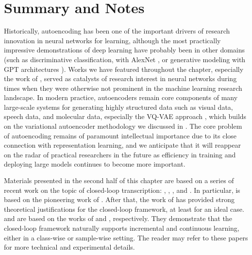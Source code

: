 \documentclass[../../book-main.tex]{subfiles}
\begin{document}
\section{Summary and Notes}
Historically, autoencoding has been one of the important drivers of research
innovation in neural networks for learning, although the most practically
impressive demonstrations of deep learning have probably been in other domains
(such as discriminative classification, with AlexNet
\cite{krizhevsky2012imagenet}, or generative modeling with GPT architectures
\cite{brown2020language}).
Works we have featured throughout the chapter, especially the work of
\cite{Hinton504}, served as catalysts of research interest in neural networks
during times when they were otherwise not prominent in the machine learning
research landscape. 
In modern practice, autoencoders remain core components of many large-scale
systems for generating highly structured data such as visual data, speech data,
and molecular data, especially the VQ-VAE approach
\cite{van-den-Oord2017-jr}, which builds on the variational autoencoder
methodology we discussed in .
The core problem of autoencoding remains of paramount intellectual importance
due to its close connection with representation learning, and we anticipate that
it will reappear on the radar of practical researchers in the future as
efficiency in training and deploying large models continues to become more
important.

Materials presented in the second half of this chapter are based on a series of
recent work on the topic of closed-loop transcription: \cite{Dai-entropy-2022}, 
\cite{pai2022pursuit}, \cite{tong2023incremental}, and \cite{pmlr-v234-tong24a}. In particular,  is based on the pioneering work of \cite{Dai-entropy-2022}. After that, the work of \cite{pai2022pursuit} has provided strong theoretical justifications for the closed-loop framework, at least for an ideal case.  and  are based on the works of \cite{tong2023incremental} and \cite{pmlr-v234-tong24a}, respectively. They demonstrate that the closed-loop framework naturally supports incremental and continuous learning, either in a class-wise or sample-wise setting. The reader may refer to these papers for more technical and experimental details.
\end{document}
